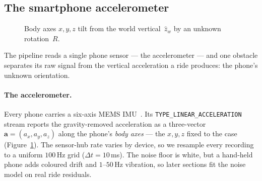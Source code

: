 \documentclass[manuscript,review,screen]{acmart}
\begin{document}
\subsection{The smartphone accelerometer}
\label{sec:bg-imu}

\begin{figure}
  \vspace{-0.6em}
  \centering
  \caption{Body axes $x,y,z$ tilt from the world
    vertical~$\hat z_w$ by an unknown rotation~$R$.}
  \label{fig:accel-frame}
  \vspace{-0.6em}
\end{figure}

The pipeline reads a single phone sensor --- the accelerometer ---
and one obstacle separates its raw signal from the vertical
acceleration a ride produces: the phone's unknown orientation.

\paragraph{The accelerometer.}
Every phone carries a six-axis MEMS IMU~\cite{beeby2004mems}.  Its
\texttt{TYPE\_LINEAR\_ACCELERATION} stream reports the
gravity-removed acceleration as a three-vector
$\mathbf{a}=(a_x,a_y,a_z)$ along the phone's \emph{body axes} --- the
$x,y,z$ fixed to the case (Figure~\ref{fig:accel-frame}).  The
sensor-hub rate varies by device, so we resample every recording to
a uniform $100$\,Hz grid ($\Delta t\!=\!10$\,ms).  The noise floor
is white, but a hand-held phone adds coloured drift and
$1\text{--}50$\,Hz vibration, so later sections fit the noise model
on real ride residuals.
\end{document}
